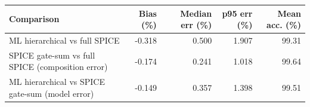 \begin{tabular}{lrrrr}
\hline
Comparison & Bias (\%) & Median err (\%) & p95 err (\%) & Mean acc. (\%) \\
\hline
ML hierarchical vs full SPICE & -0.318 & 0.500 & 1.907 & 99.31 \\
SPICE gate-sum vs full SPICE (composition error) & -0.174 & 0.241 & 1.018 & 99.64 \\
ML hierarchical vs SPICE gate-sum (model error) & -0.149 & 0.357 & 1.398 & 99.51 \\
\hline
\end{tabular}
